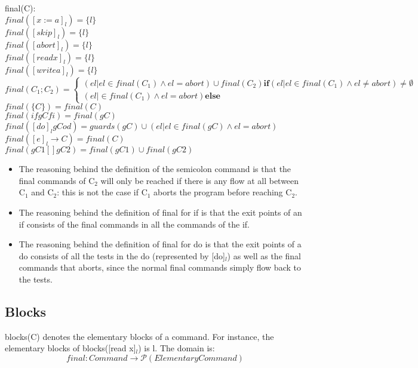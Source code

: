 \docpar
final(C):\\
$final([x := a]_l)     = \{l\}$\\
$final([skip]_l)       = \{l\}$\\
$final([abort]_l)      = \{l\}$\\
$final([read x]_l)     = \{l\}$\\
$final([write a]_l)    = \{l\}$\\
$final(C_1; C_2)		  =
\begin{cases}
(el \vert el \in final(C_1) \wedge el = abort) \cup final(C_2) \textbf{if} (el \vert el \in final(C_1) \wedge el \neq abort) \neq \emptyset \\
(el \vert \in final(C_1) \wedge el = abort) \textbf{else}
\end{cases}$\\
$final(\{C\})          = final(C)$\\
$final(if gC fi)       = final(gC)$\\
$final([do]_l gC od)  = 
guards(gC) \cup (el \vert el \in final(gC) \wedge el = abort)$\\
$final([e]_l \to C)    = final(C)$\\
$final(gC1 [] gC2)      = final(gC1) \cup final(gC2)$\\

\begin{itemize}
\item The reasoning behind the definition of the semicolon command is that the
final commands of C$_2$ will only be reached if there is any flow at all
between C$_1$ and C$_2$: this is not the case if C$_1$ aborts the program
before reaching C$_2$.
\item The reasoning behind the definition of final for if is that the exit points
of an if consists of the final commands in all the commands of the if.
\item The reasoning behind the definition of final for do is that the exit points
of a do consists of all the tests in the do (represented by [do]$_l$)
as well as the final commands that aborts, since the normal final commands
simply flow back to the tests.
\end{itemize}



\subsection{Blocks}

blocks(C) denotes the elementary blocks of a command.
For instance, the elementary blocks of blocks([read x]$_l$) is l. The domain is:
\[final \colon Command \to \mathcal{P}(Elementary Command)\]

